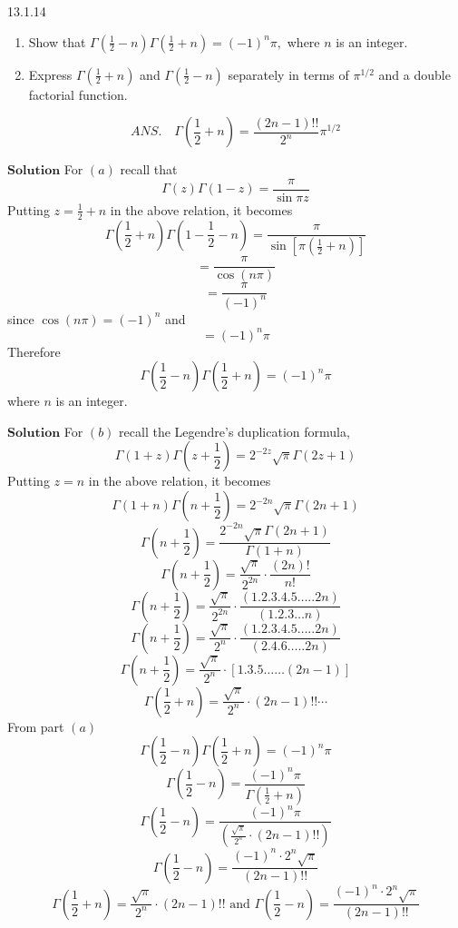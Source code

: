 \documentclass{article}
\begin{document}
\begin{flushleft}
\newpage

\begin{mybox}{13.1.14}
\begin{enumerate}[$(a)$]
\item Show that $\Gamma\left(\frac{1}{2}-n\right) \Gamma\left(\frac{1}{2}+n\right)=(-1)^{n} \pi,$ where $n$ is an integer. 
\item Express $\Gamma\left(\frac{1}{2}+n\right)$ and $\Gamma\left(\frac{1}{2}-n\right)$ separately in terms of $\pi^{1 / 2}$ and a double factorial function.
\end{enumerate}
$$
A N S . \quad \Gamma\left(\frac{1}{2}+n\right)=\frac{(2 n-1) ! !}{2^{n}} \pi^{1 / 2}
$$
\end{mybox}

$\boxed{\textbf{Solution}}$ For $(a)$ recall that 
$$\Gamma(z) \Gamma(1-z)=\frac{\pi}{\sin \pi z}$$
Putting $z=\frac{1}{2}+n$ in the above relation, it becomes
$$
\Gamma\left(\frac{1}{2}+n\right) \Gamma\left(1-\frac{1}{2}-n\right)=\frac{\pi}{\sin \left[\pi\left(\frac{1}{2}+n\right)\right]}
$$
$$
=\frac{\pi}{\cos (n \pi)}
$$
$$
=\frac{\pi}{(-1)^{n}}
$$
since $\cos (n \pi)=(-1)^{n}$ and
$$
=(-1)^{n} \pi
$$
Therefore 
$$\Gamma\left(\frac{1}{2}-n\right) \Gamma\left(\frac{1}{2}+n\right)=(-1)^{n} \pi$$ where $n$ is an integer.

$\boxed{\textbf{Solution}}$ For $(b)$ recall the Legendre's duplication formula,
$$\Gamma(1+z) \Gamma\left(z+\frac{1}{2}\right)=2^{-2 z} \sqrt{\pi} \Gamma(2 z+1)$$
Putting $z=n$ in the above relation, it becomes
$$\Gamma(1+n) \Gamma\left(n+\frac{1}{2}\right)=2^{-2 n} \sqrt{\pi} \Gamma(2 n+1)$$
$$\Gamma\left(n+\frac{1}{2}\right)=\frac{2^{-2 n} \sqrt{\pi} \Gamma(2 n+1)}{\Gamma(1+n)}$$
$$\Gamma\left(n+\frac{1}{2}\right)=\frac{\sqrt{\pi}}{2^{2 n}} \cdot \frac{(2 n) !}{n !}$$
$$\Gamma\left(n+\frac{1}{2}\right)=\frac{\sqrt{\pi}}{2^{2 n}} \cdot \frac{(1.2 .3 .4 .5 \ldots . .2 n)}{(1.2 .3 \ldots n)}$$
$$\Gamma\left(n+\frac{1}{2}\right)=\frac{\sqrt{\pi}}{2^{n}} \cdot \frac{(1.2 .3 .4 .5 \ldots . .2 n)}{(2.4 .6 \ldots . .2 n)}$$
$$\Gamma\left(n+\frac{1}{2}\right)=\frac{\sqrt{\pi}}{2^{n}} \cdot[1.3 .5 \ldots \ldots(2 n-1)]$$
$$
\Gamma\left(\frac{1}{2}+n\right)=\frac{\sqrt{\pi}}{2^{n}} \cdot(2 n-1) ! ! \cdots
$$
From part $(a)$ 
$$
\Gamma\left(\frac{1}{2}-n\right) \Gamma\left(\frac{1}{2}+n\right)=(-1)^{n} \pi
$$
$$\Gamma\left(\frac{1}{2}-n\right)=\frac{(-1)^{n} \pi}{\Gamma\left(\frac{1}{2}+n\right)}$$
$$\Gamma\left(\frac{1}{2}-n\right)=\frac{(-1)^{n} \pi}{\left(\frac{\sqrt{\pi}}{2^{n}} \cdot(2 n-1) ! !\right)}$$
$$
\Gamma\left(\frac{1}{2}-n\right)=\frac{(-1)^{n} \cdot 2^{n} \sqrt{\pi}}{(2 n-1) ! !}
$$
$$
\Gamma\left(\frac{1}{2}+n\right)=\frac{\sqrt{\pi}}{2^{n}} \cdot(2 n-1) ! ! \text { and } \Gamma\left(\frac{1}{2}-n\right)=\frac{(-1)^{n} \cdot 2^{n} \sqrt{\pi}}{(2 n-1) ! !}
$$


\end{flushleft}
\end{document}
